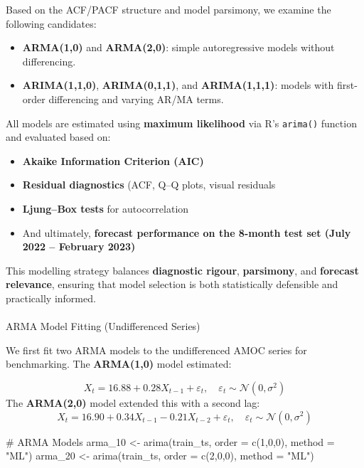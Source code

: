 \documentclass[
  11pt,
]{article}
\makeatletter
\let\oldparagraph\paragraph
\renewcommand{\paragraph}{
    \@ifstar
      \xxxParagraphStar
      \xxxParagraphNoStar
  }
\newcommand{\xxxParagraphStar}[1]{\oldparagraph*{#1}\mbox{}}
\newcommand{\xxxParagraphNoStar}[1]{\oldparagraph{#1}\mbox{}}
\newenvironment{Shaded}{\begin{snugshade}}{\end{snugshade}}
\newcommand{\AttributeTok}[1]{\textcolor[rgb]{0.40,0.45,0.13}{#1}}
\newcommand{\CommentTok}[1]{\textcolor[rgb]{0.37,0.37,0.37}{#1}}
\newcommand{\DecValTok}[1]{\textcolor[rgb]{0.68,0.00,0.00}{#1}}
\newcommand{\FunctionTok}[1]{\textcolor[rgb]{0.28,0.35,0.67}{#1}}
\newcommand{\NormalTok}[1]{\textcolor[rgb]{0.00,0.23,0.31}{#1}}
\newcommand{\OtherTok}[1]{\textcolor[rgb]{0.00,0.23,0.31}{#1}}
\newcommand{\StringTok}[1]{\textcolor[rgb]{0.13,0.47,0.30}{#1}}
\makeatother
\begin{document}
Based on the ACF/PACF structure and model parsimony, we examine the
following candidates:

\begin{itemize}
\item
  \textbf{ARMA(1,0)} and \textbf{ARMA(2,0)}: simple autoregressive
  models without differencing.
\item
  \textbf{ARIMA(1,1,0)}, \textbf{ARIMA(0,1,1)}, and
  \textbf{ARIMA(1,1,1)}: models with first-order differencing and
  varying AR/MA terms.
\end{itemize}

All models are estimated using \textbf{maximum likelihood} via R's
\texttt{arima()} function and evaluated based on:

\begin{itemize}
\item
  \textbf{Akaike Information Criterion (AIC)}
\item
  \textbf{Residual diagnostics} (ACF, Q--Q plots, visual residuals
\item
  \textbf{Ljung--Box tests} for autocorrelation
\item
  And ultimately, \textbf{forecast performance on the 8-month test set
  (July 2022 -- February 2023)}
\end{itemize}

This modelling strategy balances \textbf{diagnostic rigour},
\textbf{parsimony}, and \textbf{forecast relevance}, ensuring that model
selection is both statistically defensible and practically informed.

\paragraph{ARMA Model Fitting (Undifferenced
Series)}\label{arma-model-fitting-undifferenced-series}

We first fit two ARMA models to the undifferenced AMOC series for
benchmarking. The \textbf{ARMA(1,0)} model estimated:

\[
X_t = 16.88 + 0.28 X_{t-1} + \varepsilon_t, \quad \varepsilon_t \sim \mathcal{N}(0, \sigma^2)
\] The \textbf{ARMA(2,0)} model extended this with a second lag: \[
X_t = 16.90 + 0.34 X_{t-1} - 0.21 X_{t-2} + \varepsilon_t, \quad \varepsilon_t \sim \mathcal{N}(0, \sigma^2)
\]

\begin{Shaded}
\begin{Highlighting}[]
\CommentTok{\# ARMA Models}
\NormalTok{arma\_10 }\OtherTok{\textless{}{-}} \FunctionTok{arima}\NormalTok{(train\_ts, }\AttributeTok{order =} \FunctionTok{c}\NormalTok{(}\DecValTok{1}\NormalTok{,}\DecValTok{0}\NormalTok{,}\DecValTok{0}\NormalTok{), }\AttributeTok{method =} \StringTok{"ML"}\NormalTok{)}
\NormalTok{arma\_20 }\OtherTok{\textless{}{-}} \FunctionTok{arima}\NormalTok{(train\_ts, }\AttributeTok{order =} \FunctionTok{c}\NormalTok{(}\DecValTok{2}\NormalTok{,}\DecValTok{0}\NormalTok{,}\DecValTok{0}\NormalTok{), }\AttributeTok{method =} \StringTok{"ML"}\NormalTok{)}
\end{Highlighting}
\end{Shaded}
\end{document}
